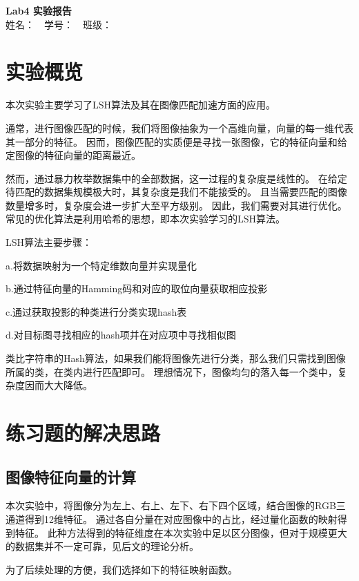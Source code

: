 \documentclass{article}
\begin{document}
\begin{center}
    \Large \textbf{Lab4 实验报告}\\
    \vspace{1em}
    姓名：~~学号：~~班级：
\end{center}

\section{实验概览}

    本次实验主要学习了LSH算法及其在图像匹配加速方面的应用。

    通常，进行图像匹配的时候，我们将图像抽象为一个高维向量，向量的每一维代表其一部分的特征。
    因而，图像匹配的实质便是寻找一张图像，它的特征向量和给定图像的特征向量的距离最近。

    然而，通过暴力枚举数据集中的全部数据，这一过程的复杂度是线性的。
    在给定待匹配的数据集规模极大时，其复杂度是我们不能接受的。
    且当需要匹配的图像数量增多时，复杂度会进一步扩大至平方级别。
    因此，我们需要对其进行优化。常见的优化算法是利用哈希的思想，即本次实验学习的LSH算法。

    LSH算法主要步骤：

    a.将数据映射为一个特定维数向量并实现量化

    b.通过特征向量的Hamming码和对应的取位向量获取相应投影

    c.通过获取投影的种类进行分类实现hash表

    d.对目标图寻找相应的hash项并在对应项中寻找相似图

    类比字符串的Hash算法，如果我们能将图像先进行分类，那么我们只需找到图像所属的类，在类内进行匹配即可。
    理想情况下，图像均匀的落入每一个类中，复杂度因而大大降低。

\section{练习题的解决思路}

\subsection{图像特征向量的计算}

    本次实验中，将图像分为左上、右上、左下、右下四个区域，结合图像的RGB三通道得到12维特征。
    通过各自分量在对应图像中的占比，经过量化函数的映射得到特征。
    此种方法得到的特征维度在本次实验中足以区分图像，但对于规模更大的数据集并不一定可靠，见后文的理论分析。

    为了后续处理的方便，我们选择如下的特征映射函数。
\end{document}
